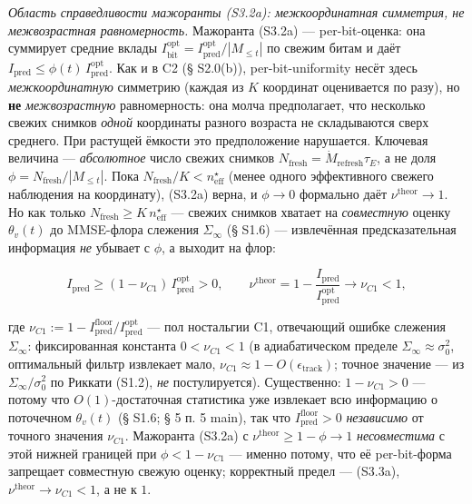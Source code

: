 \documentclass[12pt]{iopart}
\begin{document}
\emph{Область справедливости мажоранты (S3.2a): межкоординатная симметрия, не межвозрастная равномерность.} Мажоранта (S3.2a) --- per-bit-оценка: она суммирует средние вклады \(I^{\text{opt}}_{\text{bit}} = I_{\text{pred}}^{\text{opt}}/|M_{\le t}|\) по свежим битам и даёт \(I_{\text{pred}} \le \phi(t)\,I_{\text{pred}}^{\text{opt}}\). Как и в C2 (§ S2.0(b)), per-bit-uniformity несёт здесь \emph{межкоординатную} симметрию (каждая из \(K\) координат оценивается по разу), но \textbf{не} \emph{межвозрастную} равномерность: она молча предполагает, что несколько свежих снимков \emph{одной} координаты разного возраста не складываются сверх среднего. При растущей ёмкости это предположение нарушается. Ключевая величина --- \emph{абсолютное} число свежих снимков \(N_{\text{fresh}} = \dot M_{\text{refresh}}\tau_E\), а не доля \(\phi = N_{\text{fresh}}/|M_{\le t}|\). Пока \(N_{\text{fresh}}/K < n_{\text{eff}}^\star\) (менее одного эффективного свежего наблюдения на координату), (S3.2a) верна, и \(\phi \to 0\) формально даёт \(\nu^{\text{theor}} \to 1\). Но как только \(N_{\text{fresh}} \ge K\,n_{\text{eff}}^\star\) --- свежих снимков хватает на \emph{совместную} оценку \(\theta_v(t)\) до MMSE-флора слежения \(\Sigma_\infty\) (§ S1.6) --- извлечённая предсказательная информация \emph{не} убывает с \(\phi\), а выходит на флор:



\begin{equation}I_{\text{pred}} \ge (1-\nu_{C1})\,I_{\text{pred}}^{\text{opt}} > 0, \qquad \nu^{\text{theor}} = 1 - \frac{I_{\text{pred}}}{I_{\text{pred}}^{\text{opt}}} \to \nu_{C1} < 1, \tag{S3.3a}\end{equation}



где \(\nu_{C1} := 1 - I_{\text{pred}}^{\text{floor}}/I_{\text{pred}}^{\text{opt}}\) --- пол ностальгии C1, отвечающий ошибке слежения \(\Sigma_\infty\): фиксированная константа \(0 < \nu_{C1} < 1\) (в адиабатическом пределе \(\Sigma_\infty \approx \sigma_0^2\), оптимальный фильтр извлекает мало, \(\nu_{C1} \approx 1 - O(\epsilon_{\text{track}})\); точное значение --- из \(\Sigma_\infty/\sigma_0^2\) по Риккати (S1.2), \emph{не} постулируется). Существенно: \(1-\nu_{C1} > 0\) --- потому что \(O(1)\)-достаточная статистика уже извлекает всю информацию о поточечном \(\theta_v(t)\) (§ S1.6; § 5 п. 5 main), так что \(I_{\text{pred}}^{\text{floor}} > 0\) \emph{независимо} от точного значения \(\nu_{C1}\). Мажоранта (S3.2a) с \(\nu^{\text{theor}} \ge 1-\phi \to 1\) \emph{несовместима} с этой нижней границей при \(\phi < 1-\nu_{C1}\) --- именно потому, что её per-bit-форма запрещает совместную свежую оценку; корректный предел --- (S3.3a), \(\nu^{\text{theor}} \to \nu_{C1} < 1\), а не к \(1\).
\end{document}
